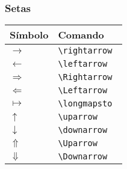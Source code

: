\documentclass[brazilian]{beamer}
\begin{document}
\begin{frame}[fragile]
    \frametitle{Setas}

    \begin{table}
        \begin{tabular}{O{1.5cm}l}
            Símbolo & Comando \\ \hline
            \(\rightarrow  \) & \lstinline[style=myStyleLatex]!\rightarrow ! \\ \hline
            \(\leftarrow \) & \lstinline[style=myStyleLatex]!\leftarrow ! \\ \hline
            \(\Rightarrow \) & \lstinline[style=myStyleLatex]!\Rightarrow ! \\ \hline
            \(\Leftarrow  \) & \lstinline[style=myStyleLatex]!\Leftarrow ! \\ \hline
            \(\longmapsto \) & \lstinline[style=myStyleLatex]!\longmapsto ! \\ \hline
            \(\uparrow \) & \lstinline[style=myStyleLatex]!\uparrow ! \\ \hline
            \(\downarrow \) & \lstinline[style=myStyleLatex]!\downarrow ! \\ \hline
            \(\Uparrow \) & \lstinline[style=myStyleLatex]!\Uparrow ! \\ \hline
            \(\Downarrow \) & \lstinline[style=myStyleLatex]!\Downarrow ! \\ \hline
        \end{tabular}
    \end{table}

\end{frame}
\end{document}
